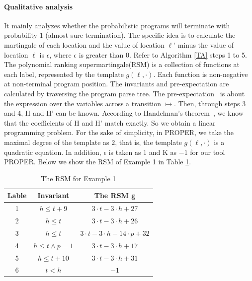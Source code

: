 \documentclass[sigconf,review, anonymous]{acmart}
\begin{document}
\paragraph{Qualitative analysis} It mainly analyzes whether the probabilistic programs will terminate with probability $1$ (almost sure termination). The specific idea is to calculate the martingale of each location and the value of location $\ell$' minus the value of location $\ell$ is $\epsilon$, where $\epsilon$ is greater than $0$. Refer to Algorithm \ref{TA} steps 1 to 5. The polynomial ranking supermartingale(RSM) is a collection of functions at each label, represented by the template $g(\ell,\cdot)$. Each function is non-negative at non-terminal program position. The invariants and pre-expectation are calculated by traversing the program parse tree. The pre-expectation~\cite{Chakarov2013Martingales} is about the expression over the variables across a transition $\mapsto$. Then, through steps 3 and 4, H and H' can be known. According to Handelman's theorem~\cite{Handelman1988Representing}, we know that the coefficients of H and H' match exactly. So we obtain a linear programming problem.  For the sake of simplicity, in PROPER, we take the maximal degree of the template as $2$, that is, the template $g(\ell,\cdot)$ is a quadratic equation. In addition, $\epsilon$ is taken as $1$ and K as $-1$ for our tool PROPER. Below we show the RSM of Example 1 in Table \ref{RSM}. 

\begin{table}[htb]
	\centering
	\caption{The RSM for Example 1}
	\label{RSM}
	\begin{tabular}{|c|c|c|}
		\hline
		Lable& Invariant & The RSM g \\ \hline
		1 & $h\leq t+9$ &$3\cdot t-3\cdot h+27$ \\ \hline
		2 & $h\leq t$ &$3\cdot t-3\cdot h+26$ \\ \hline
		3 & $h\leq t$  &$3\cdot t-3\cdot h-14\cdot p+32$ \\ \hline
		4 & $h\leq t\land p=1$ &$3\cdot t-3\cdot h+17$ \\ \hline
		5 & $h\leq t+10$&$3\cdot t-3\cdot h+31$ \\ \hline
		6 & $t<h$ &$-1$ \\ \hline
	\end{tabular}
\end{table}
\end{document}
